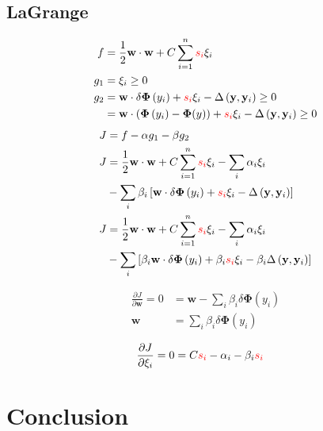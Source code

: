 \documentclass{IEEEtran}
\renewcommand{\vec}[1]{\mathbf{#1}}
\newcommand{\half}{\frac{1}{2}}
\newcommand{\loss}{\Delta\left(\vec{y}, \vec{y}_i\right)}
\begin{document}
\subsection{LaGrange} %
\begin{align}
    f &= \half \vec{w} \cdot \vec{w} + C \sum_{i=1}^n \textcolor{red}{s_i} \xi_i \\
    g_1 &= \xi_i \ge 0 \\
    g_2 &= \vec{w} \cdot \delta \vec{\Phi}\left(y_i\right) + \textcolor{red}{s_i} \xi_i - \loss \ge 0 \\
    &= \vec{w} \cdot \left(\vec{\Phi}\left(y_i\right) - \vec{\Phi}(y)\right) + \textcolor{red}{s_i} \xi_i
    - \loss \ge 0 \nonumber
\end{align}
\begin{align}
    J &= f - \alpha g_1 - \beta g_2 \\
    J &= \half \vec{w} \cdot \vec{w} + C \sum_{i=1}^n \textcolor{red}{s_i} \xi_i -
        \sum_i \alpha_i \xi_i \nonumber \\ & -
        \sum_i \beta_i \left[\vec{w} \cdot \delta \vec{\Phi}\left(y_i\right) + \textcolor{red}{s_i} \xi_i
        - \loss\right] \nonumber \\
    J &= \half \vec{w} \cdot \vec{w} + C \sum_{i=1}^n \textcolor{red}{s_i} \xi_i -
        \sum_i \alpha_i \xi_i \nonumber \\ & -
        \sum_i \left[ \beta_i \vec{w} \cdot \delta \vec{\Phi}\left(y_i\right) + \beta_i
        \textcolor{red}{s_i} \xi_i - \beta_i \loss\right] \nonumber \nonumber
\end{align}

\begin{align}
    \frac{\partial J}{\partial \vec{w}} = 0 &= \vec{w} - \sum_i \beta_i \delta \vec{\Phi}\left(y_i\right) \\
    \vec{w} &= \sum_i \beta_i \delta \vec{\Phi}\left(y_i\right) \nonumber
\end{align}

\begin{align}
    \frac{\partial J}{\partial \xi_i} = 0 &= C \textcolor{red}{s_i} - \alpha_i - \beta_i \textcolor{red}{s_i}
\end{align}

\section{Conclusion} %


\end{document}
